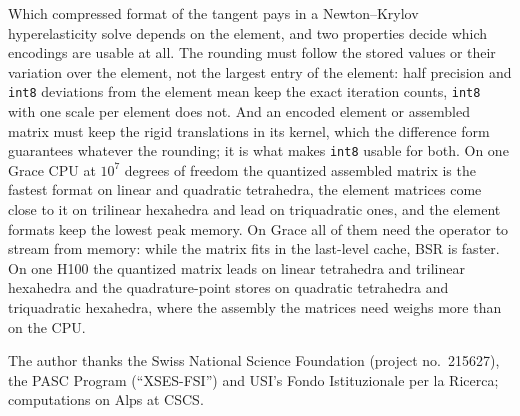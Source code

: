 \documentclass[sigconf,balance=false]{acmart}
\begin{document}
Which compressed format of the tangent pays in a Newton--Krylov hyperelasticity solve depends on the
element, and two properties decide which encodings are usable at all.  The rounding must follow the
stored values or their variation over the element, not the largest entry of the element: half
precision and \texttt{int8} deviations from the element mean keep the exact iteration counts,
\texttt{int8} with one scale per element does not.  And an encoded element or assembled matrix must
keep the rigid translations in its kernel, which the difference form guarantees whatever the
rounding; it is what makes \texttt{int8} usable for both.  On one Grace CPU at $10^7$ degrees of
freedom the quantized assembled matrix is the fastest format on linear and quadratic tetrahedra, the
element matrices come close to it on trilinear hexahedra and lead on triquadratic ones, and the
element formats keep the lowest peak memory.  On Grace all of them need the operator to stream from
memory: while the matrix fits in the last-level cache, BSR is faster.  On one H100 the quantized matrix leads on linear
tetrahedra and trilinear hexahedra and the quadrature-point stores on quadratic tetrahedra and
triquadratic hexahedra, where the assembly the matrices need weighs more than on the CPU.

\begin{acks}
The author thanks the Swiss National Science Foundation (project no.~215627), the PASC Program
(``XSES-FSI'') and USI's Fondo Istituzionale per la Ricerca; computations on Alps at CSCS.
\end{acks}

\FloatBarrier


\end{document}
